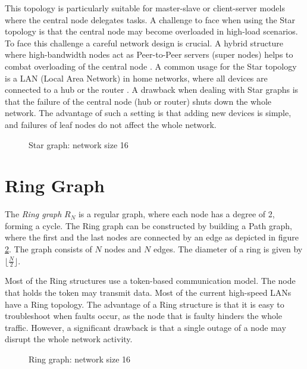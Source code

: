 This topology is particularly suitable for master-slave or client-server models where the central node delegates tasks. A challenge to face when using the Star topology is that the central node may become overloaded in high-load scenarios. To face this challenge a careful network design is crucial. A hybrid structure where high-bandwidth nodes act as Peer-to-Peer servers (super nodes) helps to combat overloading of the central node \cite{Peer2PeerSchindelhaauer2023}. A common usage for the Star topology is a LAN (Local Area Network) in home networks, where all devices are connected to a hub or the router \cite{Jayeola2023}. A drawback when dealing with Star graphs is that the failure of the central node (hub or router) shuts down the whole network. The advantage of such a setting is that adding new devices is simple, and failures of leaf nodes do not affect the whole network.

\begin{figure}[H]
    \centering
    
    \caption{Star graph: network size 16}
    \label{fig:stargraphDemo}
\end{figure}

\section{Ring Graph}\label{sec:2ringgraph}
The \textit{Ring graph} $R_N$ is a regular graph, where each node has a degree of 2, forming a cycle. The Ring graph can be constructed by building a Path graph, where the first and the last nodes are connected by an edge as depicted in figure \ref{fig:ring}. The graph consists of $N$ nodes and $N$ edges. The diameter of a ring is given by $\lfloor{\frac{N}{2}}\rfloor$.

Most of the Ring structures use a token-based communication model. The node that holds the token may transmit data. Most of the current high-speed LANs have a Ring topology. The advantage of a Ring structure is that it is easy to troubleshoot when faults occur, as the node that is faulty hinders the whole traffic. However, a significant drawback is that a single outage of a node may disrupt the whole network activity. \cite{Vidomenko1997}

\begin{figure}[H]
    \centering
    \scalebox{0.8}{}
    \caption{Ring graph: network size 16}
    \label{fig:ring}
\end{figure}

